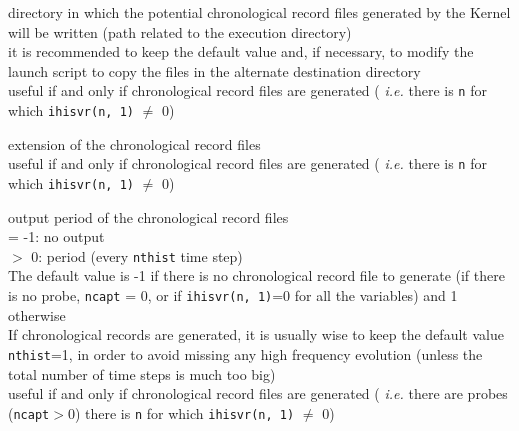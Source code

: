 {directory in which the potential chronological record files generated by
the Kernel will be written (path related to the execution directory)\\
it is recommended to keep the default value and, if necessary, to modify the
launch script to copy the files in the alternate destination directory\\
useful if and only if chronological record files are generated ({\em
i.e.} there is {\tt n} for which {\tt ihisvr(n, 1)} $\ne$ 0)}

{extension of the chronological record files\\
useful if and only if chronological record files are generated ({\em
i.e.} there is {\tt n} for which {\tt ihisvr(n, 1)} $\ne$ 0)}

{output period of the chronological record files\\
\hspace*{1.3cm}= -1: no output\\
\hspace*{1.3cm}$>$ 0: period  (every {\tt nthist} time step)\\
The default value is -1 if there is no chronological record file to
generate (if there is no probe, {\tt ncapt} = 0, or if {\tt ihisvr(n, 1)}=0 for
all the variables) and 1 otherwise\\
If chronological records are generated, it is usually wise to keep the default
value {\tt nthist}=1, in order to avoid missing any high frequency evolution (unless
the total number of time steps is much too big)\\
useful if and only if chronological record files are generated ({\em
i.e.} there are probes ({\tt ncapt}$>$0) there is {\tt n} for which
{\tt ihisvr(n, 1)} $\ne$ 0)}

